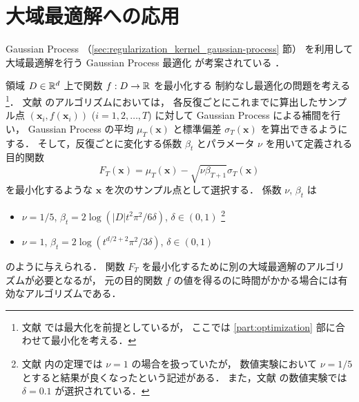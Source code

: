 \section{大域最適解への応用}\label{sec:interp_kernel_global-optimization}

Gaussian Process （\ref{sec:regularization_kernel_gaussian-process} 節）
を利用して大域最適解を行う
Gaussian Process 最適化
が考案されている
\cite{Srinivas2010}．

領域 $D \in \mathbb{R}^d$ 上で関数 $f : D \to \mathbb{R}$ を最小化する
制約なし最適化の問題を考える
\footnote{文献 \cite{Srinivas2010} では最大化を前提としているが，%
    ここでは \ref{part:optimization} 部に合わせて最小化を考える．}．
文献 \cite{Srinivas2010} のアルゴリズムにおいては，
各反復ごとにこれまでに算出したサンプル点
$(\bm{x}_i, f(\bm{x}_i))$ ($i = 1,2,\ldots,T$)
に対して Gaussian Process による補間を行い，
Gaussian Process の平均 $\mu_T(\bm{x})$ と標準偏差 $\sigma_T(\bm{x})$ を算出できるようにする．
そして，反復ごとに変化する係数 $\beta_t$ とパラメータ $\nu$ を用いて定義される目的関数
\begin{equation}
    F_T(\bm{x}) = \mu_T(\bm{x}) - \sqrt{\nu \beta_{T+1}} \sigma_T(\bm{x})
\end{equation}
を最小化するような $\bm{x}$ を次のサンプル点として選択する．
係数 $\nu$, $\beta_t$ は
\begin{itemize}
    \item $\nu = 1/5$, $\beta_t = 2 \log(|D| t^2 \pi^2 / 6 \delta)$,
          $\delta \in (0, 1)$
          \cite{Srinivas2010}
          \footnote{文献 \cite{Srinivas2010} 内の定理では $\nu = 1$ の場合を扱っていたが，%
              数値実験において $\nu = 1/5$ とすると結果が良くなったという記述がある．%
              また，文献 \cite{Srinivas2010} の数値実験では $\delta = 0.1$ が選択されている．}
    \item $\nu=1$, $\beta_t = 2 \log(t^{d/2+2} \pi^2 /3 \delta)$,
          $\delta \in (0, 1)$
          \cite{Brochu2010}
\end{itemize}
のように与えられる．
関数 $F_T$ を最小化するために別の大域最適解のアルゴリズムが必要となるが，
元の目的関数 $f$ の値を得るのに時間がかかる場合には有効なアルゴリズムである．
